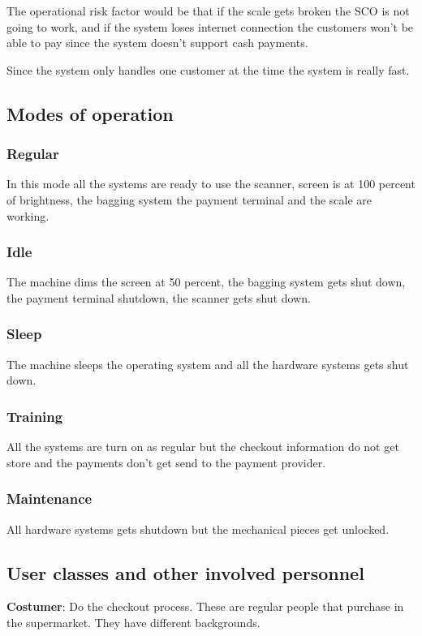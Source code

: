 The operational risk factor would be that if the scale gets broken the SCO is 
not going to work, and if the system loses internet connection the customers 
won't be able to pay since the system doesn't support cash payments. \newline

Since the system only handles one customer at the time the 
system is really fast.

\subsection{Modes of operation}

\subsubsection{Regular}
In this mode all the systems are ready to use the scanner, screen is at 100 
percent of brightness, the bagging system the payment terminal 
and the scale are working.

\subsubsection{Idle}
The machine dims the screen at 50 percent, the bagging system gets shut 
down, the payment terminal shutdown, the scanner gets shut down.

\subsubsection{Sleep}
The machine sleeps the operating system and all the hardware systems 
gets shut down.

\subsubsection{Training}
All the systems are turn on as regular but the checkout information do 
not get store and the payments don't get send to the payment provider.

\subsubsection{Maintenance}
All hardware systems gets shutdown but the mechanical pieces get unlocked.

\subsection{User classes and other involved personnel}
\textbf{Costumer}: Do the checkout process. These are regular people that 
purchase in the supermarket. They have different backgrounds. \newline

